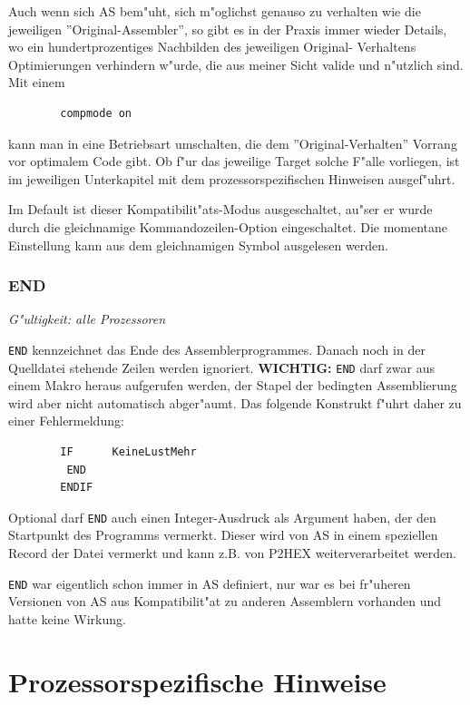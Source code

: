 \documentclass[12pt,a4paper,twoside]{report}
\makeatletter
\newcommand{\bb}[1]{{\bf #1}}
\newcommand{\tty}[1]{{\tt #1}}
\newcommand{\ttindex}[1]{\index{#1@{\tt #1}}}
\newcommand{\asname}{AS}
\makeatother
\begin{document}
Auch wenn sich \asname{} bem"uht, sich m"oglichst genauso zu verhalten wie die
jeweiligen ''Original-Assembler'', so gibt es in der Praxis immer wieder
Details, wo ein hundertprozentiges Nachbilden des jeweiligen Original-
Verhaltens Optimierungen verhindern w"urde, die aus meiner Sicht valide
und n"utzlich sind.  Mit einem
\begin{verbatim}
        compmode on
\end{verbatim}
kann man in eine Betriebsart umschalten, die dem ''Original-Verhalten''
Vorrang vor optimalem Code gibt.  Ob f"ur das jeweilige Target solche
F"alle vorliegen, ist im jeweiligen Unterkapitel mit dem prozessorspezifischen
Hinweisen ausgef"uhrt.
\par
Im Default ist dieser Kompatibilit"ats-Modus ausgeschaltet, au"ser er
wurde durch die gleichnamige Kommandozeilen-Option eingeschaltet. Die
momentane Einstellung kann aus dem gleichnamigen Symbol ausgelesen
werden.


\subsection{END}
\ttindex{END}

{\em G"ultigkeit: alle Prozessoren}

\tty{END} kennzeichnet das Ende des Assemblerprogrammes.  Danach
noch in der Quelldatei stehende Zeilen werden ignoriert.
\bb{WICHTIG:} \tty{END} darf zwar aus einem Makro heraus aufgerufen
werden, der Stapel der bedingten Assemblierung wird aber nicht
automatisch abger"aumt.  Das folgende Konstrukt f"uhrt daher zu
einer Fehlermeldung:
\begin{verbatim}
        IF      KeineLustMehr
         END
        ENDIF
\end{verbatim}
Optional darf \tty{END} auch einen Integer-Ausdruck als Argument haben,
der den Startpunkt des Programms vermerkt.  Dieser wird von \asname{} in einem
speziellen Record der Datei vermerkt und kann z.B. von P2HEX
weiterverarbeitet werden.
\par
\tty{END} war eigentlich schon immer in \asname{} definiert, nur war es
bei fr"uheren Versionen von \asname{} aus Kompatibilit"at zu anderen
Assemblern vorhanden und hatte keine Wirkung.


\cleardoublepage
\chapter{Prozessorspezifische Hinweise}
\end{document}
